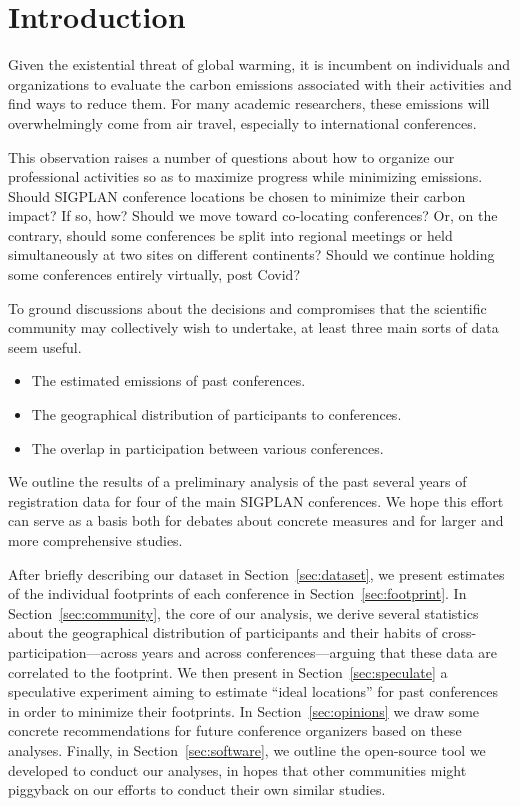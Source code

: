 \section{Introduction}

Given the existential threat of global warming, it is incumbent on
individuals and organizations to evaluate the carbon emissions
associated with their activities and find ways to reduce them.  For many
academic researchers, these emissions will overwhelmingly come from air
travel, especially to international conferences.

This observation raises a number of questions about how to organize our
professional activities so as to maximize progress while minimizing
emissions.  Should SIGPLAN conference locations be chosen to minimize their
carbon impact? If
so, how? Should we move toward co-locating conferences? Or, on the contrary,
should some conferences be split into regional meetings or held
simultaneously at two sites on different continents?
Should we continue holding some conferences entirely virtually,
post Covid?

To ground discussions about the decisions and compromises that the
scientific community may collectively wish to undertake, at least three
main sorts of data seem useful.
\begin{itemize}
\item The estimated emissions of past conferences.
\item The geographical distribution of participants to conferences.
\item The overlap in participation between various conferences.
\end{itemize}

We outline the results of a preliminary analysis of the past several
years of registration data for four of the main SIGPLAN conferences.  We
hope this effort can serve as a basis both for debates about concrete
measures and for larger and more comprehensive studies.

After briefly describing our dataset in Section~\ref{sec:dataset}, we
present estimates of the individual footprints of each conference in
Section~\ref{sec:footprint}.  In Section~\ref{sec:community}, the core of
our analysis, we derive several statistics about the geographical
distribution of participants and their habits of
cross-participation---across years and across conferences---arguing that
these data are correlated to the footprint.  We then present in
Section~\ref{sec:speculate} a speculative experiment aiming to estimate
``ideal locations'' for past conferences in order to minimize their
footprints.  \ifopinions In Section~\ref{sec:opinions} we draw some concrete
recommendations for future conference organizers based on these analyses.
\fi Finally, in Section~\ref{sec:software}, we outline the open-source tool
we developed to conduct our analyses, in hopes that other communities might
piggyback on our efforts to conduct their own similar studies.
